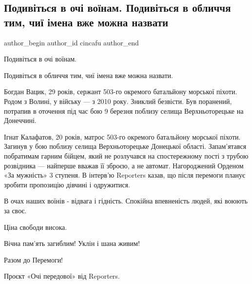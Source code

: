  
 
 
 
 
 
\subsection{Подивіться в очі воїнам. Подивіться в обличчя тим, чиї імена вже можна назвати}
\label{sec:21_04_2022.fb.cincafu.1.voiny}
 
\ifcmt
 author_begin
   author_id cincafu
 author_end
\fi

Подивіться в очі воїнам. 

Подивіться в обличчя тим, чиї імена вже можна назвати. 

Богдан Вацик, 29 років, сержант 503-го окремого батальйону морської піхоти.
Родом з Волині, у війську — з 2010 року. Зниклий безвісти. Був поранений,
потрапив в оточення під час бою 9 березня поблизу селища Верхньоторецьке на
Донеччині.

Ігнат Калафатов, 20 років, матрос 503-го окремого батальйону морської піхоти.
Загинув у бою поблизу селища Верхньоторецьке Донецької області. Запам'ятався
побратимам гарним бійцем, який не розлучався на спостережному пості з трубою
розвідника — найперше вважав її зброєю, а не автомат. Нагороджений Орденом «За
мужність» 3 ступеня. В інтерв'ю Reporters казав, що після перемоги планує
зробити пропозицію дівчині і одружитися.

В очах наших воїнів - відвага і гідність. Спокійна впевненість людей, які
воюють за своє.

Ціна свободи висока. 

Вічна пам'ять загиблим! Уклін і шана живим! 

Разом до Перемоги!

Проєкт «Очі передової» від Reporters.

